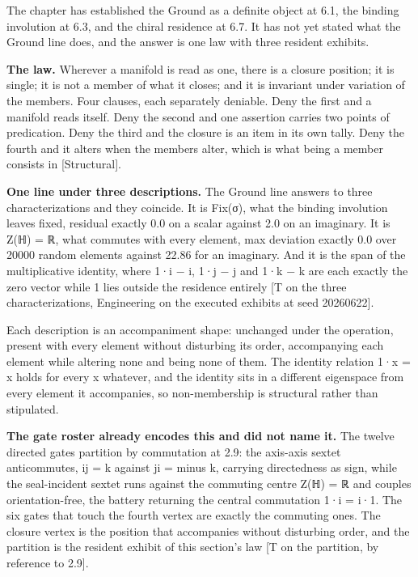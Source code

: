 \documentclass[10pt,twocolumn]{article}
\begin{document}
The chapter has established the Ground as a definite object at 6.1, the
binding involution at 6.3, and the chiral residence at 6.7. It has not
yet stated what the Ground line does, and the answer is one law with
three resident exhibits.

\textbf{The law.} Wherever a manifold is read as one, there is a closure
position; it is single; it is not a member of what it closes; and it is
invariant under variation of the members. Four clauses, each separately
deniable. Deny the first and a manifold reads itself. Deny the second
and one assertion carries two points of predication. Deny the third and
the closure is an item in its own tally. Deny the fourth and it alters
when the members alter, which is what being a member consists in
{[}Structural{]}.

\textbf{One line under three descriptions.} The Ground line answers to
three characterizations and they coincide. It is Fix(σ), what the
binding involution leaves fixed, residual exactly 0.0 on a scalar
against 2.0 on an imaginary. It is Z(ℍ) = ℝ, what commutes with every
element, max deviation exactly 0.0 over 20000 random elements against
22.86 for an imaginary. And it is the span of the multiplicative
identity, where 1·i − i, 1·j − j and 1·k − k are each exactly the zero
vector while 1 lies outside the residence entirely {[}T on the three
characterizations, Engineering on the executed exhibits at seed
20260622{]}.

Each description is an accompaniment shape: unchanged under the
operation, present with every element without disturbing its order,
accompanying each element while altering none and being none of them.
The identity relation 1·x = x holds for every x whatever, and the
identity sits in a different eigenspace from every element it
accompanies, so non-membership is structural rather than stipulated.

\textbf{The gate roster already encodes this and did not name it.} The
twelve directed gates partition by commutation at 2.9: the axis-axis
sextet anticommutes, ij = k against ji = minus k, carrying directedness
as sign, while the seal-incident sextet runs against the commuting
centre Z(ℍ) = ℝ and couples orientation-free, the battery returning the
central commutation 1·i = i·1. The six gates that touch the fourth
vertex are exactly the commuting ones. The closure vertex is the
position that accompanies without disturbing order, and the partition is
the resident exhibit of this section's law {[}T on the partition, by
reference to 2.9{]}.
\end{document}
